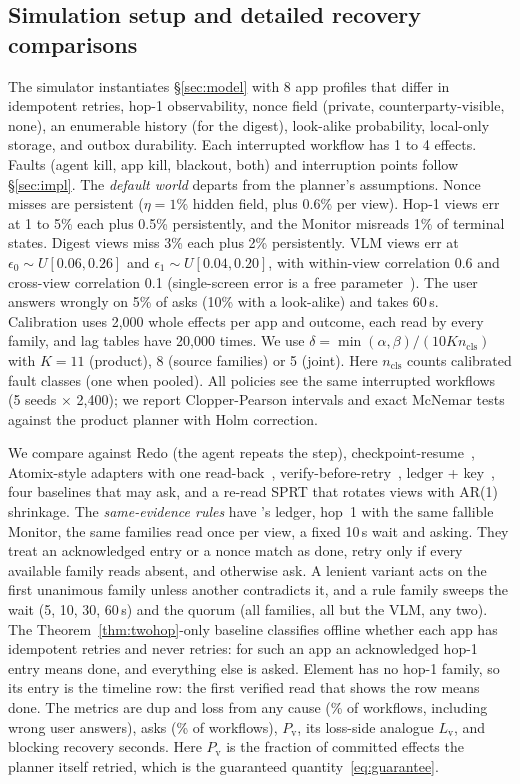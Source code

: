 \subsection{Simulation setup and detailed recovery comparisons}
 The simulator instantiates \S\ref{sec:model} with 8 app profiles that differ in idempotent retries, hop-1 observability, nonce field (private, counterparty-visible,
none), an enumerable history (for the digest), look-alike probability, local-only storage, and outbox durability. Each interrupted workflow has 1 to 4 effects. Faults (agent kill, app
kill, blackout, both) and interruption points follow \S\ref{sec:impl}. The \emph{default world} departs from the planner's assumptions. Nonce misses are persistent ($\eta{=}1\%$ hidden
field, plus 0.6\% per view). Hop-1 views err at 1 to 5\% each plus 0.5\% persistently, and the Monitor misreads 1\% of terminal states. Digest views miss 3\% each plus 2\% persistently.
VLM views err at $\epsilon_0{\sim}U[0.06,0.26]$ and $\epsilon_1{\sim}U[0.04,0.20]$, with within-view correlation 0.6 and cross-view correlation 0.1 (single-screen error is a free
parameter~\cite{pan2024autonomous}). The user answers wrongly on 5\% of asks (10\% with a look-alike) and takes 60\,s. Calibration uses 2{,}000 whole effects per app and outcome, each read by every family, and lag tables have 20{,}000 times. We use $\delta=\min(\alpha,\beta)/(10K n_{\mathrm{cls}})$
with $K{=}11$ (product), 8 (source families) or 5 (joint). Here $n_{\mathrm{cls}}$ counts calibrated fault classes (one when pooled). All policies see the same \SimN interrupted workflows (5 seeds $\times$ 2{,}400); we report Clopper-Pearson intervals and exact
McNemar tests against the product planner with Holm correction.

 We compare against Redo (the agent repeats the step), checkpoint-resume~\cite{langgraph_durable,khan2026resume}, Atomix-style adapters with one
read-back~\cite{mohammadi2026atomix}, verify-before-retry~\cite{mansoor2026verified}, ledger + key~\cite{li2026exactlyonce}, four baselines that may ask, and a re-read
SPRT that rotates views with AR(1) shrinkage. The \emph{same-evidence rules} have \sys's ledger, hop~1 with the same fallible Monitor, the same families read once per view, a fixed 10\,s wait and
asking. They treat an acknowledged entry or a nonce match as done, retry only if every available family reads absent, and otherwise ask. A lenient variant acts on the first
unanimous family unless another contradicts it, and a rule family sweeps the wait (5, 10, 30, 60\,s) and the quorum (all families, all but the VLM, any two). The
Theorem~\ref{thm:twohop}-only baseline classifies offline whether each app has idempotent retries and never retries: for such an app an acknowledged hop-1 entry means done, and everything else is asked. Element has no hop-1 family, so its entry is the timeline row: the first verified read that shows the row means done.
The metrics are dup and loss from any cause (\% of workflows, including wrong user answers), asks (\% of workflows), $P_{\mathrm{v}}$, its loss-side analogue $L_{\mathrm{v}}$, and blocking recovery seconds.
Here $P_{\mathrm{v}}$ is the fraction of committed effects the planner itself retried, which is the guaranteed quantity~\eqref{eq:guarantee}.

